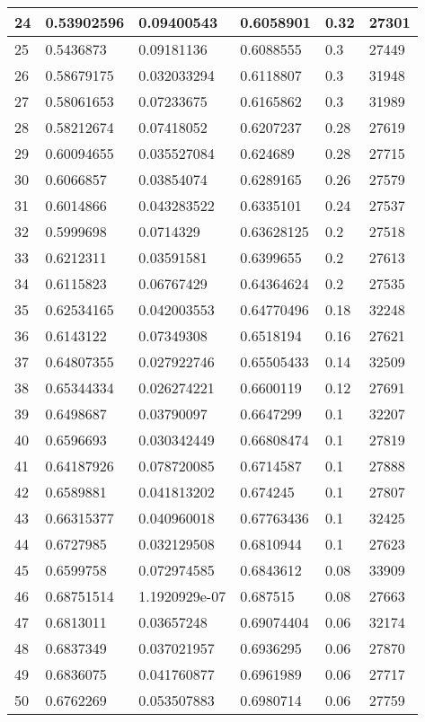 \begin{longtable}{|l|l|l|l|l|l|}
24 & 0.53902596 & 0.09400543 & 0.6058901 & 0.32 & 27301 \\ \hline 
25 & 0.5436873 & 0.09181136 & 0.6088555 & 0.3 & 27449 \\ \hline 
26 & 0.58679175 & 0.032033294 & 0.6118807 & 0.3 & 31948 \\ \hline 
27 & 0.58061653 & 0.07233675 & 0.6165862 & 0.3 & 31989 \\ \hline 
28 & 0.58212674 & 0.07418052 & 0.6207237 & 0.28 & 27619 \\ \hline 
29 & 0.60094655 & 0.035527084 & 0.624689 & 0.28 & 27715 \\ \hline 
30 & 0.6066857 & 0.03854074 & 0.6289165 & 0.26 & 27579 \\ \hline 
31 & 0.6014866 & 0.043283522 & 0.6335101 & 0.24 & 27537 \\ \hline 
32 & 0.5999698 & 0.0714329 & 0.63628125 & 0.2 & 27518 \\ \hline 
33 & 0.6212311 & 0.03591581 & 0.6399655 & 0.2 & 27613 \\ \hline 
34 & 0.6115823 & 0.06767429 & 0.64364624 & 0.2 & 27535 \\ \hline 
35 & 0.62534165 & 0.042003553 & 0.64770496 & 0.18 & 32248 \\ \hline 
36 & 0.6143122 & 0.07349308 & 0.6518194 & 0.16 & 27621 \\ \hline 
37 & 0.64807355 & 0.027922746 & 0.65505433 & 0.14 & 32509 \\ \hline 
38 & 0.65344334 & 0.026274221 & 0.6600119 & 0.12 & 27691 \\ \hline 
39 & 0.6498687 & 0.03790097 & 0.6647299 & 0.1 & 32207 \\ \hline 
40 & 0.6596693 & 0.030342449 & 0.66808474 & 0.1 & 27819 \\ \hline 
41 & 0.64187926 & 0.078720085 & 0.6714587 & 0.1 & 27888 \\ \hline 
42 & 0.6589881 & 0.041813202 & 0.674245 & 0.1 & 27807 \\ \hline 
43 & 0.66315377 & 0.040960018 & 0.67763436 & 0.1 & 32425 \\ \hline 
44 & 0.6727985 & 0.032129508 & 0.6810944 & 0.1 & 27623 \\ \hline 
45 & 0.6599758 & 0.072974585 & 0.6843612 & 0.08 & 33909 \\ \hline 
46 & 0.68751514 & 1.1920929e-07 & 0.687515 & 0.08 & 27663 \\ \hline 
47 & 0.6813011 & 0.03657248 & 0.69074404 & 0.06 & 32174 \\ \hline 
48 & 0.6837349 & 0.037021957 & 0.6936295 & 0.06 & 27870 \\ \hline 
49 & 0.6836075 & 0.041760877 & 0.6961989 & 0.06 & 27717 \\ \hline 
50 & 0.6762269 & 0.053507883 & 0.6980714 & 0.06 & 27759 \\ \hline 
\end{longtable}